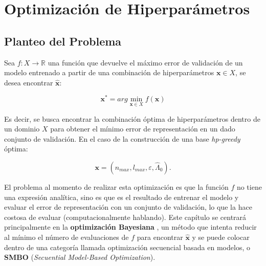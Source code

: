 \chapter{Optimización de Hiperparámetros}



\section{Planteo del Problema}

Sea $f: X \rightarrow \mathbb{R}$ una función que devuelve el máximo error de validación de un modelo entrenado a partir de una combinación de hiperparámetros $\textbf{x} \in X$, se desea encontrar $\hat{\textbf{x}}$:

\[
\textbf{x}^* = arg \min_{\textbf{x} \in X} f(\textbf{x})
\]

Es decir, se busca encontrar la combinación óptima de hiperparámetros dentro de un dominio $X$ para obtener el mínimo error de representación en un dado conjunto de validación. En el caso de la construcción de una base \textit{hp-greedy} óptima: 

\[
\textbf{x} = (n_{max}, l_{max}, \varepsilon, \hat{\Lambda}_0).
\]




El problema al momento de realizar esta optimización es que la función $f$ no tiene una expresión analítica, sino es que es el resultado de entrenar el modelo y evaluar el error de representación con un conjunto de validación, lo que la hace costosa de evaluar (computacionalmente hablando). Este capítulo se centrará principalmente en la \textbf{optimización Bayesiana} \cite{7352306, https://doi.org/10.48550/arxiv.1012.2599}, un método que intenta reducir al mínimo el número de evaluaciones de $f$ para encontrar $\hat{\textbf{x}}$ y se puede colocar dentro de una categoría llamada optimización secuencial basada en modelos, o \textbf{SMBO}\cite{dewancker2015bayesian,NIPS2011_86e8f7ab} (\textit{Secuential Model-Based Optimization}).


